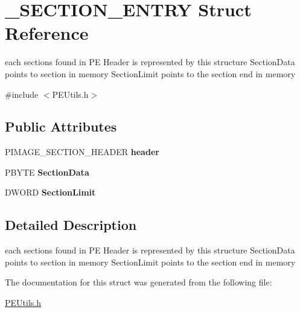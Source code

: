 \hypertarget{struct___s_e_c_t_i_o_n___e_n_t_r_y}{}\section{\+\_\+\+S\+E\+C\+T\+I\+O\+N\+\_\+\+E\+N\+T\+RY Struct Reference}
\label{struct___s_e_c_t_i_o_n___e_n_t_r_y}


each sections found in PE Header is represented by this structure Section\+Data points to section in memory Section\+Limit points to the section end in memory  




{\ttfamily \#include $<$P\+E\+Utils.\+h$>$}

\subsection*{Public Attributes}
\begin{DoxyCompactItemize}
\item 
\mbox{\label{struct___s_e_c_t_i_o_n___e_n_t_r_y_acc7df94ae35d731bfdbe15f4ed006ff6}} 
P\+I\+M\+A\+G\+E\+\_\+\+S\+E\+C\+T\+I\+O\+N\+\_\+\+H\+E\+A\+D\+ER {\bfseries header}
\item 
\mbox{\label{struct___s_e_c_t_i_o_n___e_n_t_r_y_a1dec94a7b0cca9b6a59c9079f4fb14d6}} 
P\+B\+Y\+TE {\bfseries Section\+Data}
\item 
\mbox{\label{struct___s_e_c_t_i_o_n___e_n_t_r_y_ab155a148783eab4f4b37a34d1116c393}} 
D\+W\+O\+RD {\bfseries Section\+Limit}
\end{DoxyCompactItemize}


\subsection{Detailed Description}
each sections found in PE Header is represented by this structure Section\+Data points to section in memory Section\+Limit points to the section end in memory 

The documentation for this struct was generated from the following file\+:\begin{DoxyCompactItemize}
\item 
\mbox{\hyperlink{_p_e_utils_8h}{P\+E\+Utils.\+h}}\end{DoxyCompactItemize}
